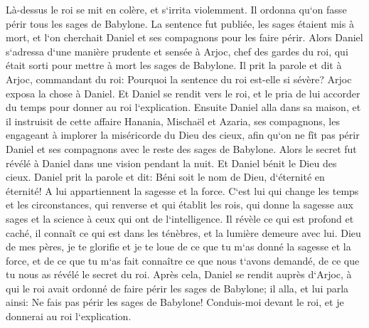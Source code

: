 \verse Là-dessus le roi se mit en colère, et s`irrita violemment. Il ordonna qu`on fasse périr tous les sages de Babylone. 
\verse La sentence fut publiée, les sages étaient mis à mort, et l`on cherchait Daniel et ses compagnons pour les faire périr. 
\verse Alors Daniel s`adressa d`une manière prudente et sensée à Arjoc, chef des gardes du roi, qui était sorti pour mettre à mort les sages de Babylone. 
\verse Il prit la parole et dit à Arjoc, commandant du roi: Pourquoi la sentence du roi est-elle si sévère? Arjoc exposa la chose à Daniel. 
\verse Et Daniel se rendit vers le roi, et le pria de lui accorder du temps pour donner au roi l`explication. 
\verse Ensuite Daniel alla dans sa maison, et il instruisit de cette affaire Hanania, Mischaël et Azaria, ses compagnons, 
\verse les engageant à implorer la miséricorde du Dieu des cieux, afin qu`on ne fît pas périr Daniel et ses compagnons avec le reste des sages de Babylone. 
\verse Alors le secret fut révélé à Daniel dans une vision pendant la nuit. Et Daniel bénit le Dieu des cieux. 
\verse Daniel prit la parole et dit: Béni soit le nom de Dieu, d`éternité en éternité! A lui appartiennent la sagesse et la force. 
\verse C`est lui qui change les temps et les circonstances, qui renverse et qui établit les rois, qui donne la sagesse aux sages et la science à ceux qui ont de l`intelligence. 
\verse Il révèle ce qui est profond et caché, il connaît ce qui est dans les ténèbres, et la lumière demeure avec lui. 
\verse Dieu de mes pères, je te glorifie et je te loue de ce que tu m`as donné la sagesse et la force, et de ce que tu m`as fait connaître ce que nous t`avons demandé, de ce que tu nous as révélé le secret du roi. 
\verse Après cela, Daniel se rendit auprès d`Arjoc, à qui le roi avait ordonné de faire périr les sages de Babylone; il alla, et lui parla ainsi: Ne fais pas périr les sages de Babylone! Conduis-moi devant le roi, et je donnerai au roi l`explication. 
